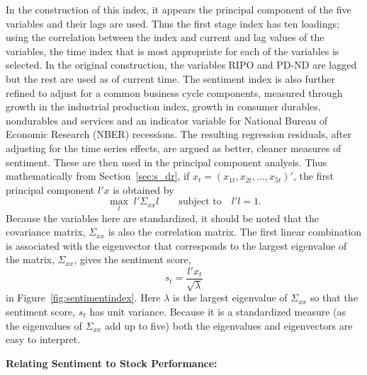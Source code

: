In the construction of this index, it appears the principal component of the five variables and their lags are used. Thus the first stage index has ten loadings; using the correlation between the index and current and lag values of the variables, the time index that is most appropriate for each of the variables is selected. In the original construction, the variables RIPO and PD-ND are lagged but the rest are used as of current time. The sentiment index is also further refined to adjust for a common business cycle components, measured through growth in the industrial production index, growth in consumer durables, nondurables and services and an indicator variable for National Bureau of Economic Research (NBER) recessions. The resulting regression residuals, after adjusting for the time series effects, are argued as better, cleaner measures of sentiment. These are then used in the principal component analysis. Thus mathematically from Section~\ref{sec:s_dr}, if $x_t= (x_{1t}, x_{2t}, \ldots, x_{5t})'$, the first principal component $l'x$ is obtained by
	\begin{equation}
	\max_l \; l' \textstyle \Sigma_{xx} l \qquad \text{subject to} \quad l'l=1.
	\end{equation}
Because the variables here are standardized, it should be noted that the covariance matrix, $\Sigma_{xx}$ is also the correlation matrix. The first linear combination is associated with the eigenvector that corresponds to the largest eigenvalue of the matrix, $\Sigma_{xx}$, gives the sentiment score,
	\begin{equation} \label{eq:stsqlambda}
	s_t= \dfrac{l' x_t}{\sqrt{\lambda}}
	\end{equation}
in Figure~\ref{fig:sentimentindex}. Here $\lambda$ is the largest eigenvalue of $\Sigma_{xx}$ so that the sentiment score, $s_t$ has unit variance. Because it is a standardized measure (as the eigenvalues of $\Sigma_{xx}$ add up to five) both the eigenvalues and eigenvectors are easy to interpret. \twomedskip


\noindent\textbf{Relating Sentiment to Stock Performance:} \twomedskip


